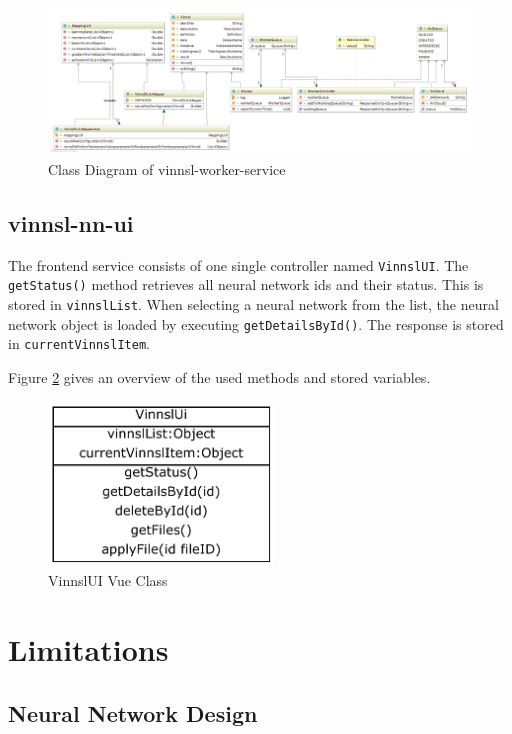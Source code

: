 \begin{figure}
\centering
\includegraphics[width=17.00000cm]{images/uml-class-diagram-vinnsl-worker-service}
\caption{Class Diagram of vinnsl-worker-service
\label{class_vinnsl-worker-service}}
\end{figure}

\subsection{vinnsl-nn-ui}\label{vinnsl-nn-ui}

The frontend service consists of one single controller named
\texttt{VinnslUI}. The \texttt{getStatus()} method retrieves all neural
network ids and their status. This is stored in \texttt{vinnslList}.
When selecting a neural network from the list, the neural network object
is loaded by executing \texttt{getDetailsById()}. The response is stored
in \texttt{currentVinnslItem}.

Figure \ref{vinnsl-nn-ui_class} gives an overview of the used methods
and stored variables.

\begin{figure}
\centering
\includegraphics[width=6.00000cm]{images/vinnsl-nn-ui_class}
\caption{VinnslUI Vue Class \label{vinnsl-nn-ui_class}}
\end{figure}

\section{Limitations}\label{limitations}

\subsection{Neural Network Design}\label{neural-network-design}

